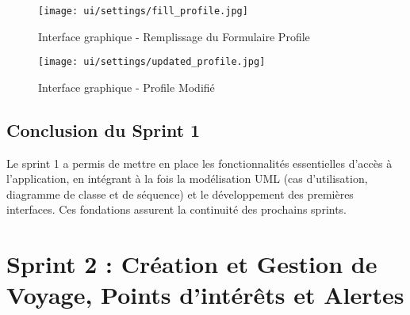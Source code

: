 \begin{figure}[H]
    \centering
    \texttt{[image: ui/settings/fill\_profile.jpg]}
    \caption{Interface graphique - Remplissage du Formulaire Profile }
\end{figure}

\begin{figure}[H]
    \centering
    \texttt{[image: ui/settings/updated\_profile.jpg]}
    \caption{Interface graphique - Profile Modifié}
\end{figure}





\subsection*{Conclusion du Sprint 1}

Le sprint 1 a permis de mettre en place les fonctionnalités essentielles d’accès à l’application, en intégrant à la fois la modélisation UML (cas d’utilisation, diagramme de classe et de séquence) et le développement des premières interfaces. Ces fondations assurent la continuité des prochains sprints.


\section{Sprint 2 : Création et Gestion de Voyage, Points d'intérêts et Alertes}

